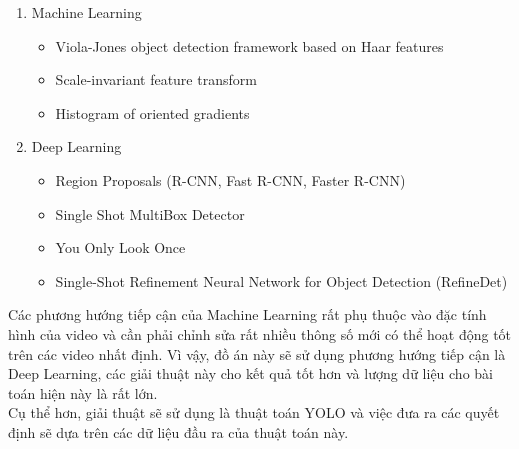 	\begin{enumerate}
	  \item Machine Learning
	  \begin{itemize}
	    \item Viola-Jones object detection framework based on Haar features
	    \item Scale-invariant feature transform
	    \item Histogram of oriented gradients 
	  \end{itemize}
	  \item Deep Learning
	  \begin{itemize}
	    \item Region Proposals (R-CNN, Fast R-CNN, Faster R-CNN)
	    \item Single Shot MultiBox Detector
	    \item You Only Look Once
	    \item Single-Shot Refinement Neural Network for Object Detection (RefineDet)
	  \end{itemize}
	\end{enumerate}

	Các phương hướng tiếp cận của Machine Learning rất phụ thuộc vào đặc tính hình của video và cần phải chỉnh sửa rất nhiều thông số mới có thể hoạt động tốt trên các video nhất định. Vì vậy, đồ án này sẽ sử dụng phương hướng tiếp cận là Deep Learning, các giải thuật này cho kết quả tốt hơn và lượng dữ liệu cho bài toán hiện này là rất lớn.
	\\
	Cụ thể hơn, giải thuật sẽ sử dụng là thuật toán YOLO và việc đưa ra các quyết định sẽ dựa trên các dữ liệu đầu ra của thuật toán này.

\newpage
